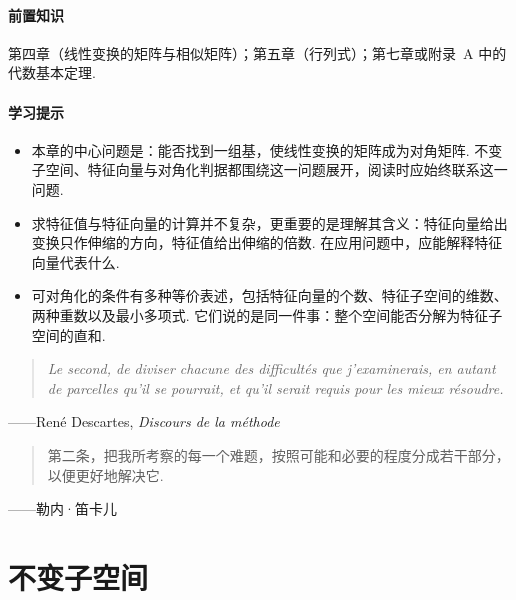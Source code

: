 \documentclass[lang=cn,10.5pt,scheme=chinese,toc=twocol,section,chinesefont=nofont,
twoside,citestyle=gb7714-2015,bibstyle=gb7714-2015]{elegantbook}
\numberwithin{equation}{section}   %
\begin{document}
\paragraph*{前置知识}

第四章（线性变换的矩阵与相似矩阵）；第五章（行列式）；第七章或附录~A 中的代数基本定理.

\paragraph*{学习提示}
\begin{itemize}
  \item 本章的中心问题是：能否找到一组基，使线性变换的矩阵成为对角矩阵. 不变子空间、特征向量与对角化判据都围绕这一问题展开，阅读时应始终联系这一问题.
  \item 求特征值与特征向量的计算并不复杂，更重要的是理解其含义：特征向量给出变换只作伸缩的方向，特征值给出伸缩的倍数. 在应用问题中，应能解释特征向量代表什么.
  \item 可对角化的条件有多种等价表述，包括特征向量的个数、特征子空间的维数、两种重数以及最小多项式. 它们说的是同一件事：整个空间能否分解为特征子空间的直和.
\end{itemize}

\newpage

\begin{tcolorbox}[epigraph]
  \begin{quote}
    \textit{Le second, de diviser chacune des difficultés que j'examinerais, en autant de parcelles qu'il se pourrait, et qu'il serait requis pour les mieux résoudre.}
  \end{quote}
  \begin{flushright}
    ——René Descartes, \textit{Discours de la méthode}
  \end{flushright}
  \begin{quote}
    第二条，把我所考察的每一个难题，按照可能和必要的程度分成若干部分，以便更好地解决它.
  \end{quote}
  \begin{flushright}
    ——勒内·笛卡儿\footnotemark
  \end{flushright}
\end{tcolorbox}

\section{不变子空间}
\end{document}
